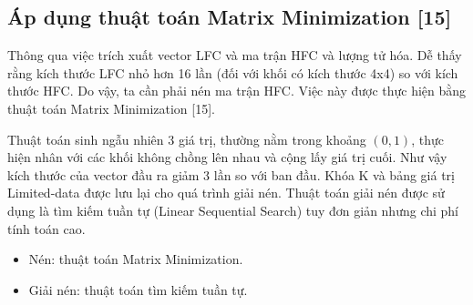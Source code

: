 \subsection{Áp dụng thuật toán Matrix Minimization [15]}
\par Thông qua việc trích xuất vector LFC và ma trận HFC và lượng tử hóa. Dễ thấy rằng kích thước LFC nhỏ hơn 16 lần (đối với khối có kích thước 4x4) so với kích thước HFC. Do vậy, ta cần phải nén ma trận HFC. Việc này được thực hiện bằng thuật toán Matrix Minimization [15].
\par Thuật toán sinh ngẫu nhiên 3 giá trị, thường nằm trong khoảng $(0, 1)$, thực hiện nhân với các khối không chồng lên nhau và cộng lấy giá trị cuối. Như vậy kích thước của vector đầu ra giảm 3 lần so với ban đầu. Khóa K và bảng giá trị Limited-data được lưu lại cho quá trình giải nén. Thuật toán giải nén được sử dụng là tìm kiếm tuần tự (Linear Sequential Search) tuy đơn giản nhưng chi phí tính toán cao.
\begin{itemize}
    \item Nén: thuật toán Matrix Minimization.
    \item Giải nén: thuật toán tìm kiếm tuần tự.
\end{itemize}

